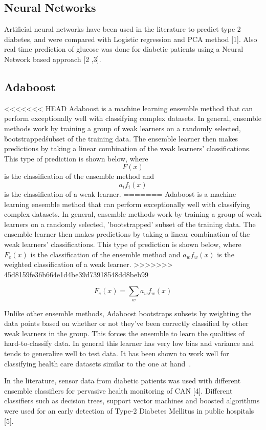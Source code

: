 \documentclass[conference]{IEEEtran}
\begin{document}
\subsection{Neural Networks}

Artificial neural networks have been used in the literature to predict type 2 diabetes, and were compared with Logistic regression and PCA method [1]. Also real time prediction of glucose was done for diabetic patients using a Neural Network based approach [2 ,3]. 

\subsection{Adaboost}
<<<<<<< HEAD
Adaboost is a machine learning ensemble method that can perform exceptionally well with classifying complex datasets. In general, ensemble methods work by training a group of weak learners on a randomly selected, \'bootstrapped\' subset of the training data. The ensemble learner then makes predictions by taking a linear combination of the weak learners' classifications. This type of prediction is shown below, where \[F(x)\] is the classification of the ensemble method and \[a_{i}f_{i}(x)\] is the classification of a weak learner.
=======
Adaboost is a machine learning ensemble method that can perform exceptionally well with classifying complex datasets. In general, ensemble methods work by training a group of weak learners on a randomly selected, 'bootstrapped' subset of the training data. The ensemble learner then makes predictions by taking a linear combination of the weak learners' classifications. This type of prediction is shown below, where $F_{e}(x)$ is the classification of the ensemble method and $a_{w}f_{w}(x)$ is the weighted classification of a weak learner.
>>>>>>> 45d8159fe36b664e1d4be39d73918548dd8beb99

\[
	F_{e}(x) = \sum_{w} a_{w}f_{w}(x)
\]

Unlike other ensemble methods, Adaboost bootstraps subsets by weighting the data points based on whether or not they've been correctly classified by other weak learners in the group. This forces the ensemble to learn the qualities of hard-to-classify data. In general this learner has very low bias and variance and tends to generalize well to test data. It has been shown to work well for classifying health care datasets similar to the one at hand~\cite{adaboost-breast-cancer}.

In the literature, sensor data from diabetic patients was used with different ensemble classifiers for pervasive health monitoring of CAN [4]. Different classifiers such as decision trees, support vector machines and boosted algorithms were used for an early detection of Type-2 Diabetes Mellitus in public hospitals [5].
\end{document}
